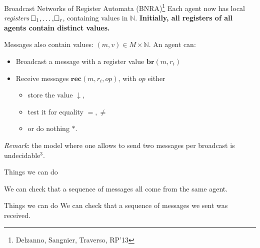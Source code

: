 \documentclass{beamer}
\newcommand{\reg}{\hspace{-0.5mm}\square}
\begin{document}
\begin{frame}{Broadcast Networks of Register Automata (BNRA)\footnote{Delzanno, Sangnier, Traverso, RP'13}}
	Each agent now has local \emph{registers} $\reg_1, \ldots, \reg_r$, containing values in $\mathbb{N}$.
	\pause
	\textbf{Initially, all registers of all agents contain distinct values.}
	
	\pause
	\vspace{0.2cm}
	Messages also contain values: $(m, v) \in M\times \mathbb{N}$.
	An agent can:
	\begin{itemize}
		\item Broadcast a message with a register value $\mathbf{br}(m, r_i)$\vspace{0.3cm}\pause
		
		
		\item Receive messages $\mathbf{rec}(m, r_i, op)$, with $op$ either
		\begin{itemize}
			\item store the value $\downarrow$,
			
			\item test it for equality $=, \neq$
			
			\item or do nothing $*$.
		\end{itemize}   
	\end{itemize}

	\pause

	\emph{Remark}: the model where one allows to send two messages per broadcast is undecidable$^3$.
\end{frame}

\begin{frame}{Things we can do}
	
	We can check that a sequence of messages all come from the same agent.

	\begin{center}
	
	\end{center}
\end{frame}

\begin{frame}{Things we can do}
	We can check that a sequence of messages we sent was received.
	
	\centering
		
\end{frame}
\end{document}

